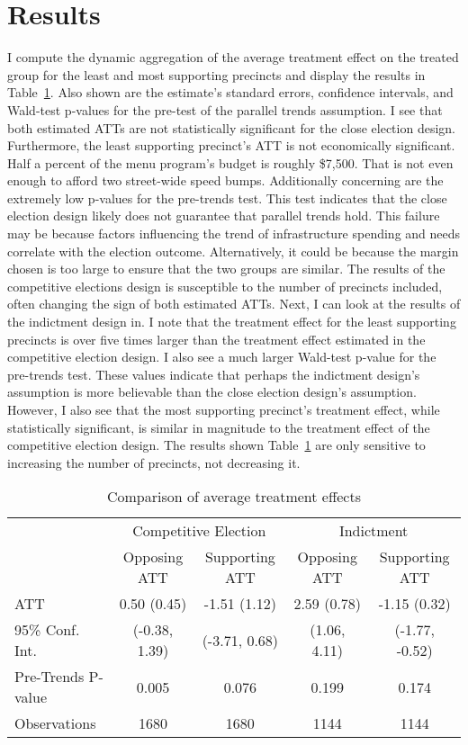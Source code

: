 \section{Results}\label{sec:results}


I compute the dynamic aggregation of the average treatment effect on the treated group for the least and most supporting precincts and display the results in Table~\ref{tab:att_comparison_combined}.
Also shown are the estimate's standard errors, confidence intervals, and Wald-test p-values for the pre-test of the parallel trends assumption.
I see that both estimated ATTs are not statistically significant for the close election design.
Furthermore, the least supporting precinct's ATT is not economically significant. 
Half a percent of the menu program's budget is roughly \$7,500. 
That is not even enough to afford two street-wide speed bumps.
Additionally concerning are the extremely low p-values for the pre-trends test.
This test indicates that the close election design likely does not guarantee that parallel trends hold.
This failure may be because factors influencing the trend of infrastructure spending and needs correlate with the election outcome.
Alternatively, it could be because the margin chosen is too large to ensure that the two groups are similar.
The results of the competitive elections design is susceptible to the number of precincts included, often changing the sign of both estimated ATTs.
Next, I can look at the results of the indictment design in.
I note that the treatment effect for the least supporting precincts is over five times larger than the treatment effect estimated in the competitive election design.
I also see a much larger Wald-test p-value for the pre-trends test.
These values indicate that perhaps the indictment design's assumption is more believable than the close election design's assumption.
However, I also see that the most supporting precinct's treatment effect, while statistically significant, is similar in magnitude to the treatment effect of the competitive election design.
The results shown Table~\ref{tab:att_comparison_combined} are only sensitive to increasing the number of precincts, not decreasing it.


\begin{table}[ht]
    \centering
    \caption{Comparison of average treatment effects}
    \label{tab:att_comparison_combined}
    \begin{tabular}{lcc|cc}
    \hline
     & \multicolumn{2}{c|}{Competitive Election} & \multicolumn{2}{c}{Indictment} \\
     & Opposing ATT & Supporting ATT & Opposing ATT & Supporting ATT \\
    \hline
    ATT & 0.50 (0.45) & -1.51 (1.12) & 2.59 (0.78) & -1.15 (0.32) \\
    95\% Conf. Int. & (-0.38, 1.39) & (-3.71, 0.68) & (1.06, 4.11) & (-1.77, -0.52) \\
    Pre-Trends P-value & 0.005  & 0.076 & 0.199 & 0.174 \\
    Observations & 1680 & 1680 & 1144 & 1144 \\
    \hline
    \end{tabular}
\end{table}

